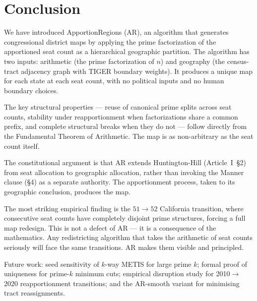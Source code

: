 \section{Conclusion}
\label{sec:conclusion}

We have introduced ApportionRegions (AR), an algorithm that
generates congressional district maps by applying the prime factorization of
the apportioned seat count as a hierarchical geographic partition. The
algorithm has two inputs: arithmetic (the prime factorization of $n$) and
geography (the census-tract adjacency graph with TIGER boundary weights).
It produces a unique map for each state at each seat count, with no political
inputs and no human boundary choices.

The key structural properties --- reuse of canonical prime splits across
seat counts, stability under reapportionment when factorizations share a
common prefix, and complete structural breaks when they do not --- follow
directly from the Fundamental Theorem of Arithmetic. The map is as
non-arbitrary as the seat count itself.

The constitutional argument is that AR extends Huntington-Hill
(Article~I~\S2) from seat allocation to geographic allocation, rather than
invoking the Manner clause (\S4) as a separate authority. The apportionment
process, taken to its geographic conclusion, produces the map.

The most striking empirical finding is the $51 \to 52$ California transition,
where consecutive seat counts have completely disjoint prime structures,
forcing a full map redesign. This is not a defect of AR --- it is a
consequence of the mathematics. Any redistricting algorithm that takes the
arithmetic of seat counts seriously will face the same transitions. AR makes
them visible and principled.

Future work: seed sensitivity of $k$-way METIS for large prime $k$;
formal proof of uniqueness for prime-$k$ minimum cuts; empirical
disruption study for 2010$\to$2020 reapportionment transitions;
and the AR-smooth variant for minimising tract reassignments.
